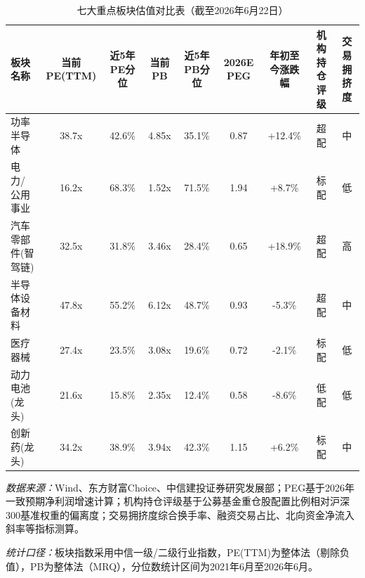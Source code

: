 \documentclass{article}
\begin{document}
\begin{table}[htbp]
  \centering
  \scriptsize
  \setlength{\tabcolsep}{4pt}
  \begin{threeparttable}
  \caption{七大重点板块估值对比表（截至2026年6月22日）}
  \label{tab:sector_valuation}
  \begin{tabular}{lcccccccc}
    \toprule
    \textbf{板块名称} & \textbf{当前PE(TTM)} & \textbf{近5年PE分位} & \textbf{当前PB} & \textbf{近5年PB分位} & \textbf{2026E PEG} & \textbf{年初至今涨跌幅} & \textbf{机构持仓评级} & \textbf{交易拥挤度} \\
    \midrule
    功率半导体 & 38.7x & 42.6\% & 4.85x & 35.1\% & 0.87 & +12.4\% & 超配 & 中 \\
    电力/公用事业 & 16.2x & 68.3\% & 1.52x & 71.5\% & 1.94 & +8.7\% & 标配 & 低 \\
    汽车零部件(智驾链) & 32.5x & 31.8\% & 3.46x & 28.4\% & 0.65 & +18.9\% & 超配 & 高 \\
    半导体设备材料 & 47.8x & 55.2\% & 6.12x & 48.7\% & 0.93 & -5.3\% & 超配 & 中 \\
    医疗器械 & 27.4x & 23.5\% & 3.08x & 19.6\% & 0.72 & -2.1\% & 标配 & 低 \\
    动力电池(龙头) & 21.6x & 15.8\% & 2.35x & 12.4\% & 0.58 & -8.6\% & 低配 & 低 \\
    创新药(龙头) & 34.2x & 38.9\% & 3.94x & 42.3\% & 1.15 & +6.2\% & 标配 & 中 \\
    \bottomrule
  \end{tabular}
  \begin{tablenotes}
    \scriptsize
    \item \textit{数据来源：}Wind、东方财富Choice、中信建投证券研究发展部；PEG基于2026年一致预期净利润增速计算；机构持仓评级基于公募基金重仓股配置比例相对沪深300基准权重的偏离度；交易拥挤度综合换手率、融资交易占比、北向资金净流入斜率等指标测算。
    \item \textit{统计口径：}板块指数采用中信一级/二级行业指数，PE(TTM)为整体法（剔除负值），PB为整体法（MRQ），分位数统计区间为2021年6月至2026年6月。
  \end{tablenotes}
  \end{threeparttable}
\end{table}
\end{document}

